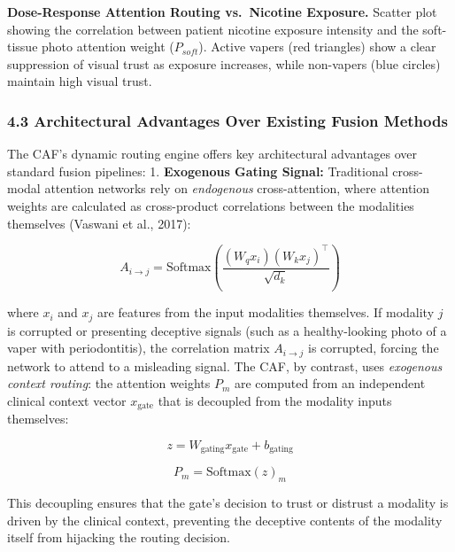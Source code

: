 \documentclass[
]{article}
\begin{document}
\textbf{Dose-Response Attention Routing vs.~Nicotine Exposure.} Scatter
plot showing the correlation between patient nicotine exposure intensity
and the soft-tissue photo attention weight (\(P_{soft}\)). Active vapers
(red triangles) show a clear suppression of visual trust as exposure
increases, while non-vapers (blue circles) maintain high visual trust.

\subsubsection{\texorpdfstring{\textbf{4.3 Architectural Advantages Over
Existing Fusion
Methods}}{4.3 Architectural Advantages Over Existing Fusion Methods}}\label{architectural-advantages-over-existing-fusion-methods}

The CAF's dynamic routing engine offers key architectural advantages
over standard fusion pipelines: 1. \textbf{Exogenous Gating Signal:}
Traditional cross-modal attention networks rely on \emph{endogenous}
cross-attention, where attention weights are calculated as cross-product
correlations between the modalities themselves (Vaswani et al., 2017):

\[A_{i \rightarrow j} = \text{Softmax}\left( \frac{(W_{q}x_{i})(W_{k}x_{j})^{\top}}{\sqrt{d_{k}}} \right)\]

where \(x_{i}\) and \(x_{j}\) are features from the input modalities
themselves. If modality \(j\) is corrupted or presenting deceptive
signals (such as a healthy-looking photo of a vaper with periodontitis),
the correlation matrix \(A_{i \rightarrow j}\) is corrupted, forcing the
network to attend to a misleading signal. The CAF, by contrast, uses
\emph{exogenous context routing}: the attention weights \(P_{m}\) are
computed from an independent clinical context vector \(x_{\text{gate}}\)
that is decoupled from the modality inputs themselves:

\[z = W_{\text{gating}}x_{\text{gate}} + b_{\text{gating}}\]

\[P_{m} = \text{Softmax}(z)_{m}\]

This decoupling ensures that the gate's decision to trust or distrust a
modality is driven by the clinical context, preventing the deceptive
contents of the modality itself from hijacking the routing decision.
\end{document}
